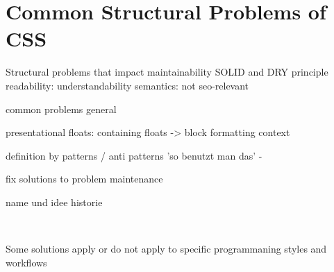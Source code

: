 

\chapter{Common Structural Problems of CSS}
Structural problems that impact maintainability
SOLID and DRY principle 
readability: understandability
semantics: not seo-relevant

common problems
general

presentational
floats:
containing floats -> block formatting context


definition by patterns / anti patterns
'so benutzt man das'
- 



fix solutions to problem
maintenance

name und idee
historie




\

Some solutions apply or do not apply to specific programmaning styles and workflows
